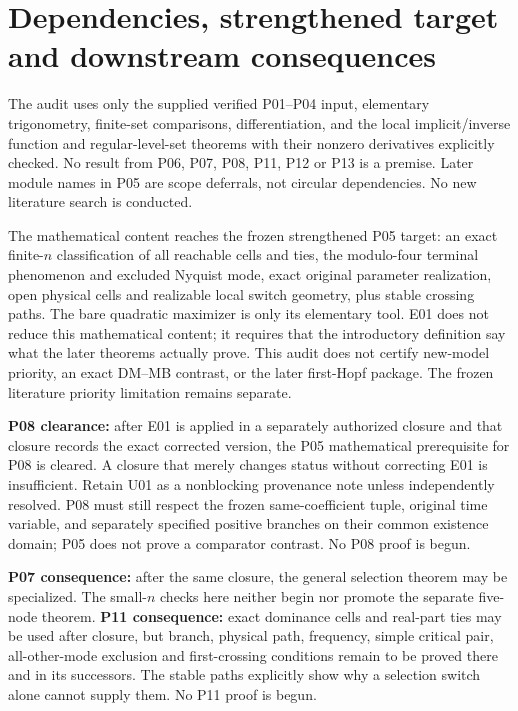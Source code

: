 \documentclass[11pt]{article}
\begin{document}
\section{Dependencies, strengthened target and downstream consequences}
The audit uses only the supplied verified P01--P04 input, elementary
trigonometry, finite-set comparisons, differentiation, and the local
implicit/inverse function and regular-level-set theorems with their
nonzero derivatives explicitly checked. No result from P06, P07, P08,
P11, P12 or P13 is a premise. Later module names in P05 are scope
deferrals, not circular dependencies. No new literature search is conducted.

The mathematical content reaches the frozen strengthened P05 target:
an exact finite-$n$ classification of all reachable cells and ties, the
modulo-four terminal phenomenon and excluded Nyquist mode, exact original
parameter realization, open physical cells and realizable local switch
geometry, plus stable crossing paths. The bare quadratic maximizer is
only its elementary tool. E01 does not reduce this mathematical content;
it requires that the introductory definition say what the later theorems
actually prove. This audit does not certify new-model priority, an exact
DM--MB contrast, or the later first-Hopf package. The frozen literature
priority limitation remains separate.

\textbf{P08 clearance:} after E01 is applied in a separately authorized
closure and that closure records the exact corrected version, the P05
mathematical prerequisite for P08 is cleared. A closure that merely
changes status without correcting E01 is insufficient. Retain U01 as
a nonblocking provenance note unless independently resolved. P08 must
still respect the frozen same-coefficient tuple, original time variable,
and separately specified positive branches on their common existence
domain; P05 does not prove a comparator contrast. No P08 proof is begun.

\textbf{P07 consequence:} after the same closure, the general selection
theorem may be specialized. The small-$n$ checks here neither begin nor
promote the separate five-node theorem. \textbf{P11 consequence:} exact
dominance cells and real-part ties may be used after closure, but branch,
physical path, frequency, simple critical pair, all-other-mode exclusion
and first-crossing conditions remain to be proved there and in its
successors. The stable paths explicitly show why a selection switch
alone cannot supply them. No P11 proof is begun.
\end{document}
